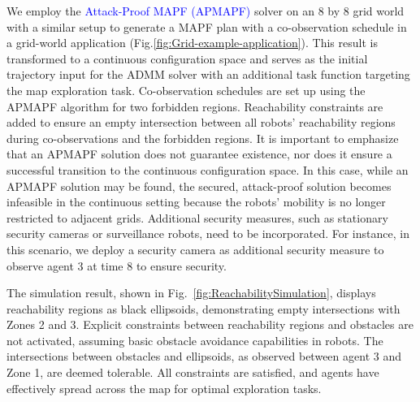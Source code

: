 \documentclass[10pt,twocolumn,twoside]{IEEEtran}
\newcommand{\new}[1]{\textcolor{blue}{#1}}
\newcommand{\news}{\color{blue}}
\begin{document}
We employ the \new{Attack-Proof MAPF (APMAPF)} solver \cite{wardega2019resilience} on an 8 by 8 grid world with a similar setup to generate a MAPF plan with a co-observation schedule in a grid-world application (Fig.\ref{fig:Grid-example-application}). This result is transformed to a continuous configuration space and serves as the initial trajectory input for the ADMM solver with an additional task function targeting the map exploration task. Co-observation schedules are set up using the APMAPF algorithm for two forbidden regions. Reachability constraints are added to ensure an empty intersection between all robots' reachability regions during co-observations and the forbidden regions. {\news It is important to emphasize that an APMAPF solution does not guarantee existence, nor does it ensure a successful transition to the continuous configuration space. In this case, while an APMAPF solution may be found, the secured, attack-proof solution becomes infeasible in the continuous setting because the robots' mobility is no longer restricted to adjacent grids. Additional security measures, such as stationary security cameras or surveillance robots, need to be incorporated. For instance, in this scenario, we deploy a security camera as additional security measure to observe agent 3 at time $8$ to ensure security.}

The simulation result, shown in Fig.~\ref{fig:ReachabilitySimulation}, displays reachability regions as black ellipsoids, demonstrating empty intersections with Zones 2 and 3. Explicit constraints between reachability regions and obstacles are not activated, assuming basic obstacle avoidance capabilities in robots. The intersections between obstacles and ellipsoids, as observed between agent 3 and Zone 1, are deemed tolerable. All constraints are satisfied, and agents have effectively spread across the map for optimal exploration tasks.

\end{document}
